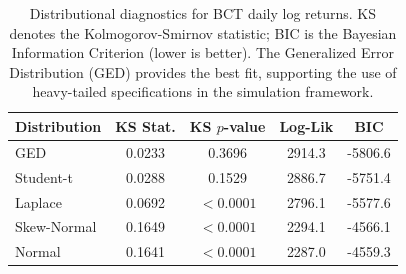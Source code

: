 \begin{table}[tbp]
\centering
\footnotesize
\caption{Distributional diagnostics for BCT daily log returns. KS denotes the Kolmogorov-Smirnov statistic; BIC is the Bayesian Information Criterion (lower is better). The Generalized Error Distribution (GED) provides the best fit, supporting the use of heavy-tailed specifications in the simulation framework.}
\label{tab:dist_diagnostics}
\begin{tabular}{l c c c c}
\hline
Distribution & KS Stat. & KS $p$-value & Log-Lik & BIC \\
\hline
  GED & 0.0233 & 0.3696 & 2914.3 & -5806.6 \\
  Student-t & 0.0288 & 0.1529 & 2886.7 & -5751.4 \\
  Laplace & 0.0692 & $<0.0001$ & 2796.1 & -5577.6 \\
  Skew-Normal & 0.1649 & $<0.0001$ & 2294.1 & -4566.1 \\
  Normal & 0.1641 & $<0.0001$ & 2287.0 & -4559.3 \\
\hline
\end{tabular}
\end{table}